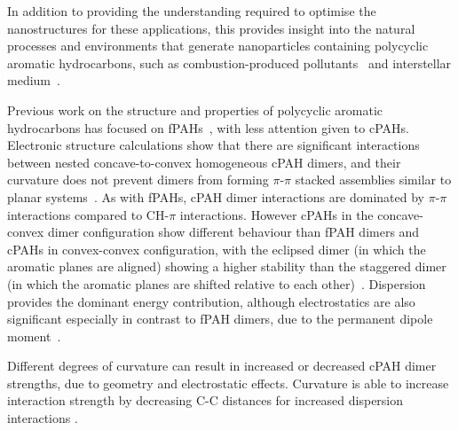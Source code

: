 In addition to providing the understanding required to optimise the nanostructures for these applications, this provides insight into the natural processes and environments that generate nanoparticles containing polycyclic aromatic hydrocarbons, such as combustion-produced pollutants~\cite{Martin2018flexo} and interstellar medium~\cite{Lovas2005}.

Previous work on the structure and properties of polycyclic aromatic hydrocarbons has focused on fPAHs~\cite{Grancic2016,chen2014size,Rapacioli2005stacked,hernandez2017dynamics}, with less attention given to cPAHs. Electronic structure calculations show that there are significant interactions between nested concave-to-convex homogeneous cPAH dimers, and their curvature does not prevent dimers from forming $\pi$-$\pi$ stacked assemblies similar to planar systems~\cite{sygula2009pi,Cabaleiro-Lago2018}. As with fPAHs, cPAH dimer interactions are dominated by $\pi$-$\pi$ interactions compared to CH-$\pi$ interactions. However cPAHs in the concave-convex dimer configuration show different behaviour than fPAH dimers and cPAHs in convex-convex configuration, with the eclipsed dimer (in which the aromatic planes are aligned) showing a higher stability than the staggered dimer (in which the aromatic planes are shifted relative to each other)~\cite{janowski2011convex,Cabaleiro-Lago2018}.
Dispersion provides the dominant energy contribution, although electrostatics are also significant especially in contrast to fPAH dimers, due to the permanent dipole moment~\cite{Cabaleiro-Lago2018,janowski2011convex}.

Different degrees of curvature can result in increased or decreased cPAH dimer strengths, due to geometry and electrostatic effects. Curvature is able to increase interaction strength by decreasing C-C distances for increased dispersion interactions \cite{kennedy2012buckyplates}. 

